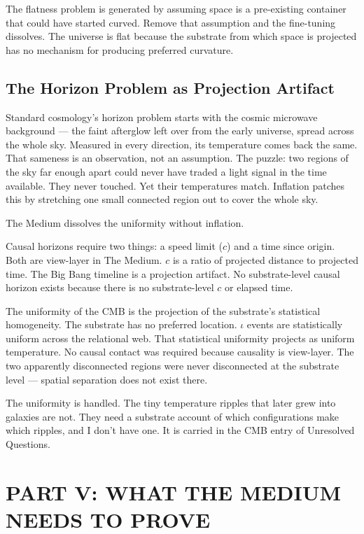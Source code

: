 \documentclass[11pt,letterpaper]{article}
\begin{document}
The flatness problem is generated by assuming space is a pre-existing container that could have started curved. Remove that assumption and the fine-tuning dissolves. The universe is flat because the substrate from which space is projected has no mechanism for producing preferred curvature.


\subsection{The Horizon Problem as Projection Artifact}
\label{sec:org119cfe3}

Standard cosmology's horizon problem starts with the cosmic microwave background --- the faint afterglow left over from the early universe, spread across the whole sky. Measured in every direction, its temperature comes back the same. That sameness is an observation, not an assumption. The puzzle: two regions of the sky far enough apart could never have traded a light signal in the time available. They never touched. Yet their temperatures match. Inflation patches this by stretching one small connected region out to cover the whole sky.

The Medium dissolves the uniformity without inflation.

Causal horizons require two things: a speed limit (\(c\)) and a time since origin. Both are view-layer in The Medium. \(c\) is a ratio of projected distance to projected time. The Big Bang timeline is a projection artifact. No substrate-level causal horizon exists because there is no substrate-level \(c\) or elapsed time.

The uniformity of the CMB is the projection of the substrate's statistical homogeneity. The substrate has no preferred location. \(\iota\) events are statistically uniform across the relational web. That statistical uniformity projects as uniform temperature. No causal contact was required because causality is view-layer. The two apparently disconnected regions were never disconnected at the substrate level --- spatial separation does not exist there.

The uniformity is handled. The tiny temperature ripples that later grew into galaxies are not. They need a substrate account of which configurations make which ripples, and I don't have one. It is carried in the CMB entry of Unresolved Questions.

\section{PART V: WHAT THE MEDIUM NEEDS TO PROVE}
\label{sec:org807dd94}
\end{document}

